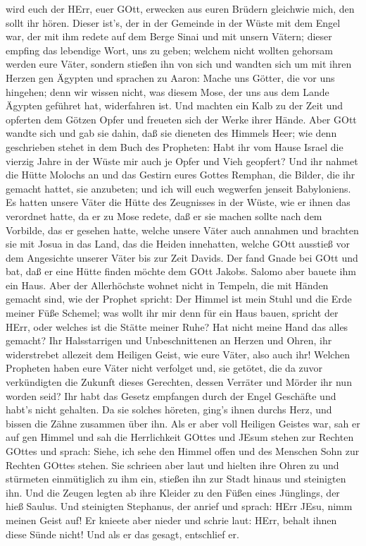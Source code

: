 wird euch der HErr, euer GOtt, erwecken aus euren Brüdern gleichwie
mich, den sollt ihr hören.  Dieser ist's, der in der
Gemeinde in der Wüste mit dem Engel war, der mit ihm redete auf dem
Berge Sinai und mit unsern Vätern; dieser empfing das lebendige Wort,
uns zu geben;  welchem nicht wollten gehorsam werden eure
Väter, sondern stießen ihn von sich und wandten sich um mit ihren Herzen
gen Ägypten  und sprachen zu Aaron: Mache uns Götter, die
vor uns hingehen; denn wir wissen nicht, was diesem Mose, der uns aus
dem Lande Ägypten geführet hat, widerfahren ist.  Und
machten ein Kalb zu der Zeit und opferten dem Götzen Opfer und freueten
sich der Werke ihrer Hände.  Aber GOtt wandte sich und gab
sie dahin, daß sie dieneten des Himmels Heer; wie denn geschrieben
stehet in dem Buch des Propheten: Habt ihr vom Hause Israel die vierzig
Jahre in der Wüste mir auch je Opfer und Vieh geopfert? 
Und ihr nahmet die Hütte Molochs an und das Gestirn eures Gottes
Remphan, die Bilder, die ihr gemacht hattet, sie anzubeten; und ich will
euch wegwerfen jenseit Babyloniens.  Es hatten unsere Väter
die Hütte des Zeugnisses in der Wüste, wie er ihnen das verordnet hatte,
da er zu Mose redete, daß er sie machen sollte nach dem Vorbilde, das er
gesehen hatte,  welche unsere Väter auch annahmen und
brachten sie mit Josua in das Land, das die Heiden innehatten, welche
GOtt ausstieß vor dem Angesichte unserer Väter bis zur Zeit Davids.
 Der fand Gnade bei GOtt und bat, daß er eine Hütte finden
möchte dem GOtt Jakobs.  Salomo aber bauete ihm ein Haus.
 Aber der Allerhöchste wohnet nicht in Tempeln, die mit
Händen gemacht sind, wie der Prophet spricht:  Der Himmel
ist mein Stuhl und die Erde meiner Füße Schemel; was wollt ihr mir denn
für ein Haus bauen, spricht der HErr, oder welches ist die Stätte meiner
Ruhe?  Hat nicht meine Hand das alles gemacht?
 Ihr Halsstarrigen und Unbeschnittenen an Herzen und Ohren,
ihr widerstrebet allezeit dem Heiligen Geist, wie eure Väter, also auch
ihr!  Welchen Propheten haben eure Väter nicht verfolget
und, sie getötet, die da zuvor verkündigten die Zukunft dieses
Gerechten, dessen Verräter und Mörder ihr nun worden seid? 
Ihr habt das Gesetz empfangen durch der Engel Geschäfte und habt's nicht
gehalten.  Da sie solches höreten, ging's ihnen durchs
Herz, und bissen die Zähne zusammen über ihn.  Als er aber
voll Heiligen Geistes war, sah er auf gen Himmel und sah die
Herrlichkeit GOttes und JEsum stehen zur Rechten GOttes und sprach:
Siehe, ich sehe den Himmel offen und des Menschen Sohn zur Rechten
GOttes stehen.  Sie schrieen aber laut und hielten ihre
Ohren zu und stürmeten einmütiglich zu ihm ein, stießen ihn zur Stadt
hinaus und steinigten ihn.  Und die Zeugen legten ab ihre
Kleider zu den Füßen eines Jünglings, der hieß Saulus.  Und
steinigten Stephanus, der anrief und sprach: HErr JEsu, nimm meinen
Geist auf!  Er knieete aber nieder und schrie laut: HErr,
behalt ihnen diese Sünde nicht! Und als er das gesagt, entschlief er.


